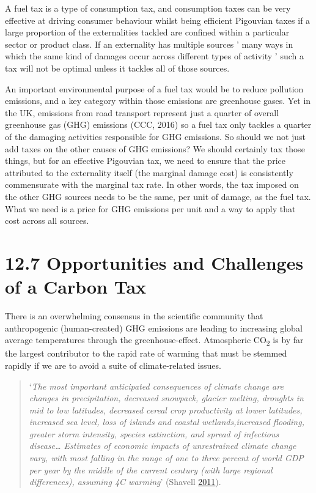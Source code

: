 \documentclass[]{tufte-handout}
\begin{document}
A fuel tax is a type of consumption tax, and consumption taxes can be
very effective at driving consumer behaviour whilst being efficient
Pigouvian taxes if a large proportion of the externalities tackled are
confined within a particular sector or product class. If an externality
has multiple sources ' many ways in which the same kind of damages occur
across different types of activity ' such a tax will not be optimal
unless it tackles all of those sources.

An important environmental purpose of a fuel tax would be to reduce
pollution emissions, and a key category within those emissions are
greenhouse gases. Yet in the UK, emissions from road transport represent
just a quarter of overall greenhouse gas (GHG) emissions (CCC, 2016) so
a fuel tax only tackles a quarter of the damaging activities responsible
for GHG emissions. So should we not just add taxes on the other causes
of GHG emissions? We should certainly tax those things, but for an
effective Pigouvian tax, we need to ensure that the price attributed to
the externality itself (the marginal damage cost) is consistently
commensurate with the marginal tax rate. In other words, the tax imposed
on the other GHG sources needs to be the same, per unit of damage, as
the fuel tax. What we need is a price for GHG emissions per unit and a
way to apply that cost across all sources.

\hypertarget{opportunities-and-challenges-of-a-carbon-tax}{%
\section{12.7 Opportunities and Challenges of a Carbon
Tax}\label{opportunities-and-challenges-of-a-carbon-tax}}

There is an overwhelming consensus in the scientific community that
anthropogenic (human-created) GHG emissions are leading to increasing
global average temperatures through the greenhouse-effect. Atmospheric
CO\textsubscript{2} is by far the largest contributor to the rapid rate
of warming that must be stemmed rapidly if we are to avoid a suite of
climate-related issues.

\begin{quote}
`\emph{The most important anticipated consequences of climate change are
changes in precipitation, decreased snowpack, glacier melting, droughts
in mid to low latitudes, decreased cereal crop productivity at lower
latitudes, increased sea level, loss of islands and coastal
wetlands,increased flooding, greater storm intensity, species
extinction, and spread of infectious disease\ldots{} Estimates of
economic impacts of unrestrained climate change vary, with most falling
in the range of one to three percent of world GDP per year by the middle
of the current century (with large regional differences), assuming 4C
warming}' (Shavell \protect\hyperlink{ref-Shavell2011}{2011}).
\end{quote}
\end{document}

